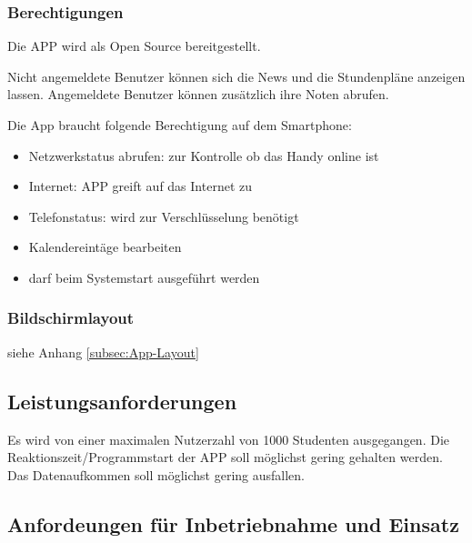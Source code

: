 \subsubsection{Berechtigungen}

Die APP wird als Open Source bereitgestellt.

Nicht angemeldete Benutzer können sich die News und die Stundenpläne anzeigen lassen. Angemeldete Benutzer können zusätzlich ihre Noten abrufen.

Die App braucht folgende Berechtigung auf dem Smartphone:
\begin{itemize}
	\item Netzwerkstatus abrufen: zur Kontrolle ob das Handy online ist
	\item Internet: APP greift auf das Internet zu
	\item Telefonstatus: wird zur Verschlüsselung benötigt
	\item Kalendereintäge bearbeiten
	\item darf beim Systemstart ausgeführt werden
\end{itemize}




\subsubsection{Bildschirmlayout}
siehe Anhang \ref{subsec:App-Layout}










\subsection{\textbf{Leistungsanforderungen}}
Es wird von einer maximalen Nutzerzahl von 1000 Studenten ausgegangen.
Die Reaktionszeit/Programmstart der APP soll möglichst gering gehalten werden.
Das Datenaufkommen soll möglichst gering ausfallen.


\subsection{\textbf{Anfordeungen für Inbetriebnahme und Einsatz}}

